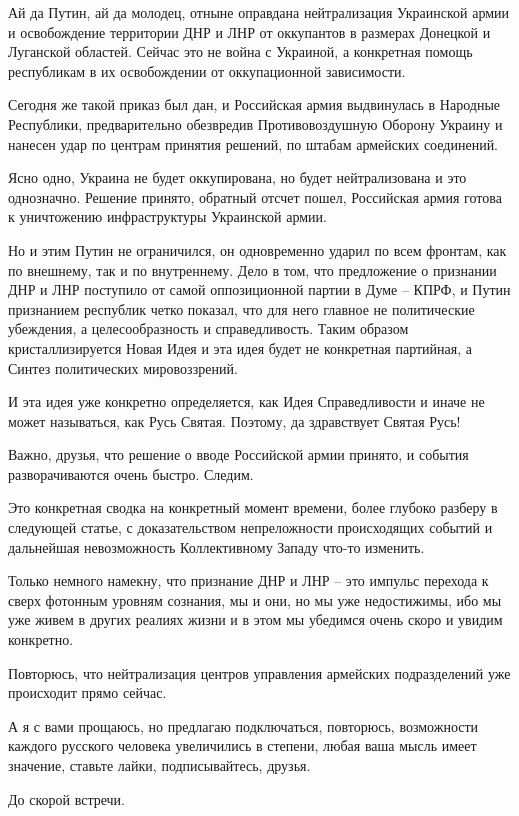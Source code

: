 \begin{zznagolos}
Ай да Путин, ай да молодец, отныне оправдана нейтрализация Украинской армии и
освобождение территории ДНР и ЛНР от оккупантов в размерах Донецкой и Луганской
областей. Сейчас это не война с Украиной, а конкретная помощь республикам в их
освобождении от оккупационной зависимости.  
\end{zznagolos}

Сегодня же такой приказ был дан, и Российская армия выдвинулась в Народные
Республики, предварительно обезвредив Противовоздушную Оборону Украину и
нанесен удар по центрам принятия решений, по штабам армейских соединений.

Ясно одно, Украина не будет оккупирована, но будет нейтрализована и это
однозначно. Решение принято, обратный отсчет пошел, Российская армия готова к
уничтожению инфраструктуры Украинской армии.

Но и этим Путин не ограничился, он одновременно ударил по всем фронтам, как по
внешнему, так и по внутреннему. Дело в том, что предложение о признании ДНР и
ЛНР поступило от самой оппозиционной партии в Думе – КПРФ, и Путин признанием
республик четко показал, что для него главное не политические убеждения, а
целесообразность и справедливость. Таким образом кристаллизируется Новая Идея и
эта идея будет не конкретная партийная, а Синтез политических мировоззрений.

\begin{zznagolos}
И эта идея уже конкретно определяется, как Идея Справедливости и иначе не может
называться, как Русь Святая. Поэтому, да здравствует Святая Русь! 
\end{zznagolos}

Важно, друзья, что решение о вводе Российской армии принято, и события
разворачиваются очень быстро. Следим.

Это конкретная сводка на конкретный момент времени, более глубоко разберу в
следующей статье, с доказательством непреложности происходящих событий и
дальнейшая невозможность Коллективному Западу что-то изменить.

\begin{zznagolos}
Только немного намекну, что признание ДНР и ЛНР – это импульс перехода к сверх
фотонным уровням сознания, мы и они, но мы уже недостижимы, ибо мы уже живем в
других реалиях жизни и в этом мы убедимся очень скоро и увидим конкретно. 
\end{zznagolos}

Повторюсь, что нейтрализация центров управления армейских подразделений уже
происходит прямо сейчас.

А я с вами прощаюсь, но предлагаю подключаться, повторюсь, возможности каждого
русского человека увеличились в степени, любая ваша мысль имеет значение,
ставьте лайки, подписывайтесь, друзья.

До скорой встречи.
